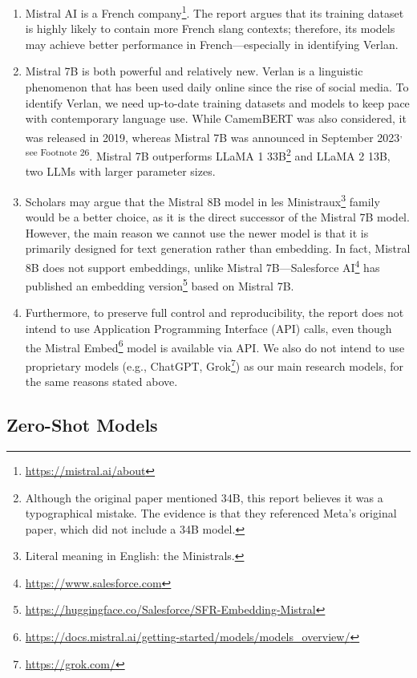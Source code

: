 \documentclass[12pt]{article}
\begin{document}
\begin{enumerate}
\item Mistral AI is a French company\footnote{\url{https://mistral.ai/about}}. The report argues that its training dataset is highly likely to contain more French slang contexts; therefore, its models may achieve better performance in French\;---\;especially in identifying Verlan.

\item Mistral 7B is both powerful and relatively new. Verlan is a linguistic phenomenon that has been used daily online since the rise of social media. To identify Verlan, we need up-to-date training datasets and models to keep pace with contemporary language use. While CamemBERT was also considered, it was released in 2019, whereas Mistral 7B was announced in September 2023\textsuperscript{, see Footnote 26}\cite{martin2019camembert}. Mistral 7B outperforms LLaMA 1 33B\footnote{Although the original paper mentioned 34B, this report believes it was a typographical mistake. The evidence is that they referenced Meta's original paper, which did not include a 34B model.} and LLaMA 2 13B, two LLMs with larger parameter sizes\cite{touvron2023llama,touvron2023llama2}. 

\item Scholars may argue that the Mistral 8B model in les Ministraux\footnote{Literal meaning in English: the Ministrals.} family would be a better choice, as it is the direct successor of the Mistral 7B model. However, the main reason we cannot use the newer model is that it is primarily designed for text generation rather than embedding. In fact, Mistral 8B does not support embeddings, unlike Mistral 7B\;---\;Salesforce AI\footnote{\url{https://www.salesforce.com}} has published an embedding version\footnote{\url{https://huggingface.co/Salesforce/SFR-Embedding-Mistral}} based on Mistral 7B. 

\item Furthermore, to preserve full control and reproducibility, the report does not intend to use Application Programming Interface (API) calls, even though the Mistral Embed\footnote{\url{https://docs.mistral.ai/getting-started/models/models_overview/}} model is available via API. We also do not intend to use proprietary models (e.g., ChatGPT, Grok\footnote{\url{https://grok.com/}}) as our main research models, for the same reasons stated above.
\end{enumerate}

\subsection{Zero-Shot Models}
\end{document}
